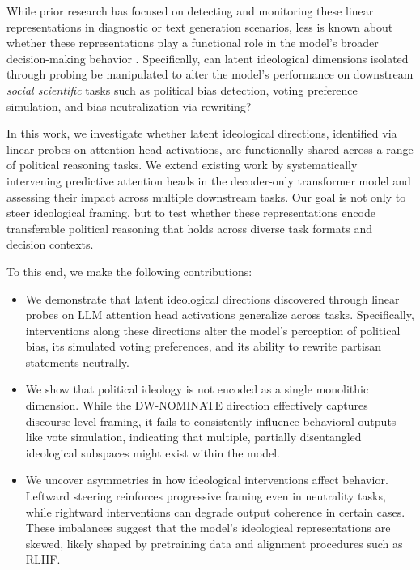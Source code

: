 \documentclass[11pt]{article}
\begin{document}
While prior research has focused on detecting and monitoring these linear representations in diagnostic \citep{gurneeLanguageModelsRepresent2023, tiggesLinearRepresentationsSentiment2023} or text generation \citep{marksGeometryTruthEmergent2023, kimLinearRepresentationsPolitical2025} scenarios, less is known about whether these representations play a functional role in the model’s broader decision-making behavior \citep{ju-etal-2024-large}. Specifically, can latent ideological dimensions isolated through probing be manipulated to alter the model's performance on downstream \textit{social scientific} tasks such as political bias detection, voting preference simulation, and bias neutralization via rewriting?

In this work, we investigate whether latent ideological directions, identified via linear probes on attention head activations, are functionally shared across a range of political reasoning tasks. We extend existing work by systematically intervening predictive attention heads in the decoder-only transformer model and assessing their impact across multiple downstream tasks. Our goal is not only to steer ideological framing, but to test whether these representations encode transferable political reasoning that holds across diverse task formats and decision contexts.

To this end, we make the following contributions:

\begin{itemize}
    \item We demonstrate that latent ideological directions discovered through linear probes on LLM attention head activations generalize across tasks. Specifically, interventions along these directions alter the model’s perception of political bias, its simulated voting preferences, and its ability to rewrite partisan statements neutrally.
    
    \item We show that political ideology is not encoded as a single monolithic dimension. While the DW-NOMINATE direction effectively captures discourse-level framing, it fails to consistently influence behavioral outputs like vote simulation, indicating that multiple, partially disentangled ideological subspaces might exist within the model.
    
    \item We uncover asymmetries in how ideological interventions affect behavior. Leftward steering reinforces progressive framing even in neutrality tasks, while rightward interventions can degrade output coherence in certain cases. These imbalances suggest that the model's ideological representations are skewed, likely shaped by pretraining data and alignment procedures such as RLHF.
\end{itemize}
\end{document}
